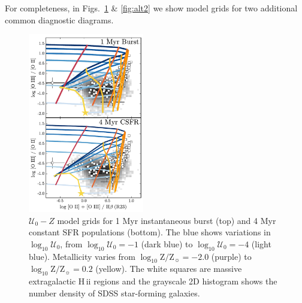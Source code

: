 \documentclass[trackchanges, twocolumn, tighten]{aastex61}
\newcommand{\logten}{\ensuremath{\log_{10}}}
\newcommand{\hii}{H\,{\sc ii}\xspace}
\newcommand{\logZeq}[1]{\ensuremath{\logten \mathrm{Z}/\mathrm{Z}_{\sun} = #1}}
\newcommand{\U}{\ensuremath{\mathcal{U}_{0}}}
\newcommand{\logU}{\ensuremath{\logten \mathcal{U}_0}}
\begin{document}
For completeness, in Figs.~\ref{fig:alt1} \& \ref{fig:alt2} we show model grids for two additional common diagnostic diagrams.
\begin{figure}
  \begin{centering}
    \includegraphics[width=0.45\textwidth]{f20a.pdf}
    \caption{$\U-Z$ model grids for 1 Myr instantaneous burst (top) and 4 Myr constant SFR populations (bottom). The blue shows variations in \logU{}, from $\logU{}=-1$ (dark blue) to $\logU{}=-4$ (light blue). Metallicity varies from \logZeq{-2.0} (purple) to \logZeq{0.2} (yellow). The white squares are massive extragalactic \hii regions and the grayscale 2D histogram shows the number density of SDSS star-forming galaxies.}
    \label{fig:alt1}
  \end{centering}
\end{figure}
\end{document}
